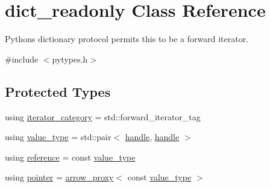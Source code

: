 \hypertarget{classdict__readonly}{}\section{dict\+\_\+readonly Class Reference}
\label{classdict__readonly}


Python\textquotesingle{}s dictionary protocol permits this to be a forward iterator.  




{\ttfamily \#include $<$pytypes.\+h$>$}

\subsection*{Protected Types}
\begin{DoxyCompactItemize}
\item 
using \mbox{\hyperlink{classdict__readonly_a03ca5952047f74c722d9a9a7b7170518}{iterator\+\_\+category}} = std\+::forward\+\_\+iterator\+\_\+tag
\item 
using \mbox{\hyperlink{classdict__readonly_a127806c5f2c38bfb96bb8dcbc5045734}{value\+\_\+type}} = std\+::pair$<$ \mbox{\hyperlink{classhandle}{handle}}, \mbox{\hyperlink{classhandle}{handle}} $>$
\item 
using \mbox{\hyperlink{classdict__readonly_a84d59082eaadc1ea6eb819992cc74f0e}{reference}} = const \mbox{\hyperlink{classdict__readonly_a127806c5f2c38bfb96bb8dcbc5045734}{value\+\_\+type}}
\item 
using \mbox{\hyperlink{classdict__readonly_a5d2c6399a70096d2e7b3004939b7c685}{pointer}} = \mbox{\hyperlink{structarrow__proxy}{arrow\+\_\+proxy}}$<$ const \mbox{\hyperlink{classdict__readonly_a127806c5f2c38bfb96bb8dcbc5045734}{value\+\_\+type}} $>$
\end{DoxyCompactItemize}
